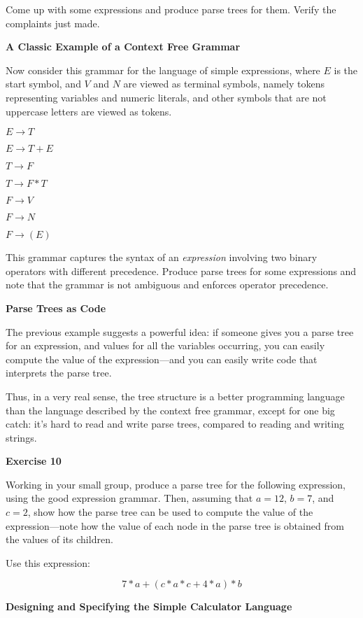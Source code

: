 \doit   Come up with some expressions and produce parse trees for them.
Verify the complaints just made.
\border

{\bf A Classic Example of a Context Free Grammar}
\medskip

Now consider this grammar for the language of simple expressions, 
where $E$ is the start symbol, and 
$V$ and $N$ are viewed as terminal symbols, namely tokens representing
variables and numeric literals, and other symbols that are not uppercase letters
are viewed as tokens.
\medskip

$E \rightarrow T$

$E \rightarrow T+E$

$T \rightarrow F$

$ T \rightarrow F * T$

$F \rightarrow V$

$F \rightarrow N$

$F \rightarrow (E)$
\medskip

\doit  This grammar captures the syntax of an {\it expression} involving two
binary operators with different precedence.  Produce parse trees for some expressions and
note that the grammar is not ambiguous and enforces operator precedence.
\border

{\bf Parse Trees as Code}
\medskip

The previous example suggests a powerful idea:  if someone gives you a parse tree for an
expression, and values for all the variables occurring, you can easily compute the value
of the expression---and you can easily write code that interprets the parse tree.
\medskip

Thus, in a very real sense, the tree structure is a better programming language than
the language described by the context free grammar, except for one big catch:  it's hard to
read and write parse trees, compared to reading and writing strings.
\border

{\bf Exercise 10}
\medskip

Working in your small group, produce a parse tree for the following expression, using the good
expression grammar.
Then, assuming that $a=12$, $b=7$, and $c=2$, show how the parse tree can be used to
compute the value of the expression---note how the value of each node in the parse tree
is obtained from the values of its children.
\medskip

Use this expression:

$$  7*a + (c*a*c+4*a)*b $$
\border

{\bf Designing and Specifying the Simple Calculator Language}
\medskip

